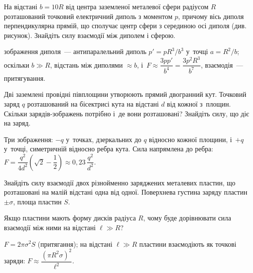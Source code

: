 \begin{problem}%
    На відстані $b= 10R$ від центра заземленої металевої сфери радіусом $R$ розташований
    точковий електричний диполь з моментом $p$, причому вісь диполя перпендикулярна прямій, що
    сполучає центр сфери з серединою осі диполя (див. рисунок). Знайдіть силу взаємодії між
    диполем і сферою.


    \begin{center}
    \end{center}
    \begin{solution}
    	зображення диполя~--- антипаралельний диполь $p' = pR^3/b^3$ у~точці $a = R^2/b$; оскільки $b\gg R$, відстань між диполями $\approx b$, і~$F \approx \dfrac{3pp'}{b^4} = \dfrac{3p^2R^3}{b^7}$, взаємодія~--- притягування.
    \end{solution}
\end{problem}

\begin{problem}%
    Дві заземлені провідні півплощини утворюють прямий двогранний кут. Точковий заряд $q$
    розташований на бісектрисі кута на відстані $d$ від кожної з~площин. Скільки
    зарядів-зображень потрібно і~де вони розташовані? Знайдіть силу, що діє на заряд.
    \begin{solution}
    	Три зображення: $-q$ у~точках, дзеркальних до $q$ відносно кожної площини, і~$+q$ у~точці, симетричній відносно ребра кута. Сила напрямлена до ребра: $F=\dfrac{q^2}{4d^2}\left(\sqrt2-\dfrac12\right)\approx0{,}23\,\dfrac{q^2}{d^2}$.
    \end{solution}
\end{problem}

\begin{problem}%
    Знайдіть силу взаємодії двох різнойменно заряджених металевих пластин, що розташовані на
    малій відстані одна від одної. Поверхнева густина заряду пластин $\pm\sigma$, площа
    пластин $S$.

    Якщо пластини мають форму дисків радіуса $R$, чому буде дорівнювати сила взаємодії між ними на
    відстані $\ell \gg R$?
    \begin{solution}
    	$F=2\pi\sigma^2S$ (притягання); на відстані $\ell\gg R$ пластини взаємодіють як точкові заряди: $F\approx\dfrac{\left(\pi R^2\sigma\right)^2}{\ell^2}$.
    \end{solution}
\end{problem}

